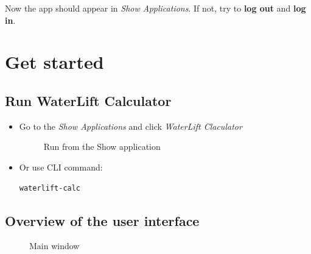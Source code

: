\documentclass[a5paper, 10pt]{article}
\begin{document}
\noindent
Now the app should appear in \emph{Show Applications}. If not, try to \textbf{log out} and \textbf{log in}.

\pagebreak

\section{Get started}
    \subsection{Run WaterLift Calculator}
        \begin{itemize}
            \item Go to the \emph{Show Applications} and click \emph{WaterLift Claculator}
            \begin{figure}[h]
                \centering
                \caption{Run from the Show application}
                \label{fig:run_the_app}
            \end{figure}

            \item Or use CLI command:
            \lstset{language=bash, frame=lines}
            \begin{lstlisting}
waterlift-calc
            \end{lstlisting}
        \end{itemize}


    \subsection{Overview of the user interface}
        \begin{figure}[h]
            \centering
            \caption{Main window}
            \label{pic:UI_Main_Window_01}
        \end{figure}
\end{document}
